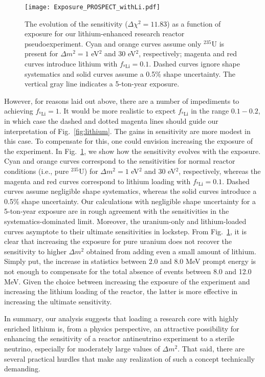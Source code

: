 \documentclass[prd, twocolumn, tightenlines, twoside, secnumarabic, superscriptaddress, preprintnumbers, nofootinbib, notitlepage]{revtex4-1}
\begin{document}
\begin{figure}[t]
    \texttt{[image: Exposure\_PROSPECT\_withLi.pdf]}
    \caption{The evolution of the sensitivity ($\Delta \chi^2 = 11.83$) as a function of exposure for our lithium-enhanced research reactor pseudoexperiment. Cyan and orange curves assume only $^{235}$U is present for $\Delta m^2 = 1$ eV$^2$ and 30 eV$^2$, respectively; magenta and red curves introduce lithium with $f_{^8\text{Li}} = 0.1$. Dashed curves ignore shape systematics and solid curves assume a 0.5\% shape uncertainty. The vertical gray line indicates a 5-ton-year exposure.}
\label{fig:exposureLi}
\end{figure}

However, for reasons laid out above, there are a number of impediments to achieving $f_{^8\text{Li}} = 1$. It would be more realistic to expect $f_{^8\text{Li}}$ in the range $0.1-0.2$, in which case the dashed and dotted magenta lines should guide our interpretation of Fig.~\ref{fig:lithium}. The gains in sensitivity are more modest in this case. To compensate for this, one could envision increasing the exposure of the experiment. In Fig.~\ref{fig:exposureLi}, we show how the sensitivity evolves with the exposure. Cyan and orange curves correspond to the sensitivities for normal reactor conditions (i.e., pure $^{235}$U) for $\Delta m^2 = 1$ eV$^2$ and 30 eV$^2$, respectively, whereas the magenta and red curves correspond to lithium loading with $f_{^8\text{Li}} = 0.1$. Dashed curves assume negligible shape systematics, whereas the solid curves introduce a 0.5\% shape uncertainty. Our calculations with negligible shape uncertainty for a 5-ton-year exposure are in rough agreement with the sensitivities in the systematics-dominated limit. Moreover, the uranium-only and lithium-loaded curves asymptote to their ultimate sensitivities in lockstep. From Fig.~\ref{fig:exposureLi}, it is clear that increasing the exposure for pure uranium does not recover the sensitivity to higher $\Delta m^2$ obtained from adding even a small amount of lithium. Simply put, the increase in statistics between 2.0 and 8.0 MeV prompt energy is not enough to compensate for the total absence of events between 8.0 and 12.0 MeV. Given the choice between increasing the exposure of the experiment and increasing the lithium loading of the reactor, the latter is more effective in increasing the ultimate sensitivity.

In summary, our analysis suggests that loading a research core with highly enriched lithium is, from a physics perspective, an attractive possibility for enhancing the sensitivity of a reactor antineutrino experiment to a sterile neutrino, especially for moderately large values of $\Delta m^2$. That said, there are several practical hurdles that make any realization of such a concept technically demanding. 
\end{document}
